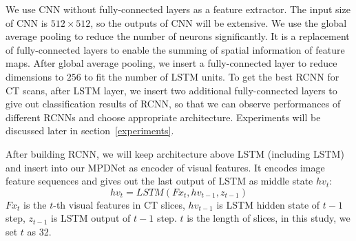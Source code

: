 \documentclass[journal]{IEEEtran}
\begin{document}
We use CNN without fully-connected layers as a feature extractor. The input size of CNN is $512 \times 512$, so the outputs of CNN will be extensive. We use the global average pooling \cite{lin2014network} to reduce the number of neurons significantly. It is a replacement of fully-connected layers to enable the summing of spatial information of feature maps. After global average pooling, we insert a fully-connected layer to reduce dimensions to $256$ to fit the number of LSTM units.
To get the best RCNN for CT scans, after LSTM layer, we insert two additional fully-connected layers to give out classification results of RCNN, so that we can observe performances of different RCNNs and choose appropriate architecture. Experiments will be discussed later in section~\ref{experiments}.

After building RCNN, we will keep architecture above LSTM (including LSTM) and insert into our MPDNet as encoder of visual features. It encodes image feature sequences and gives out the last output of LSTM as middle state $hv_t$:
\begin{equation}
hv_t = LSTM(Fx_t, hv_{t-1}, z_{t-1})
\label{hvt}
\end{equation}
$Fx_t$ is the $t$-th visual features in CT slices, $hv_{t-1}$ is LSTM hidden state of $t-1$ step, $z_{t-1}$ is LSTM output of $t-1$ step. $t$ is the length of slices, in this study, we set $t$ as 32.
\end{document}
